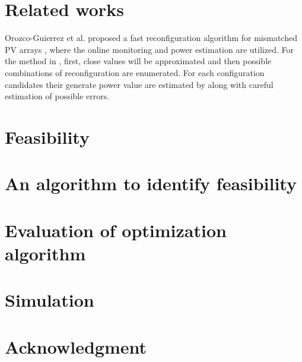 \documentclass[conference]{IEEEtran}
\begin{document}
\section{Related works}\label{Sec3}
Orozco-Guierrez et al. proposed a fast reconfiguration algorithm for mismatched PV arrays \cite{orozco2016optimized}, where the online monitoring \cite{carotenuto2014online} and power estimation \cite{orozco2015fast} are utilized. For the method in \cite{orozco2016optimized}, first, close values will be approximated and then possible combinations of reconfiguration are enumerated. For each configuration candidates their generate power value are estimated by \cite{orozco2015fast} along with careful estimation of possible errors.
\section{Feasibility}\label{Sec4}

\section{An algorithm to identify feasibility}\label{Sec5}

\section{Evaluation of optimization algorithm}\label{Sec6}

\section{Simulation}\label{Sec7}

\section*{Acknowledgment}


\end{document}
